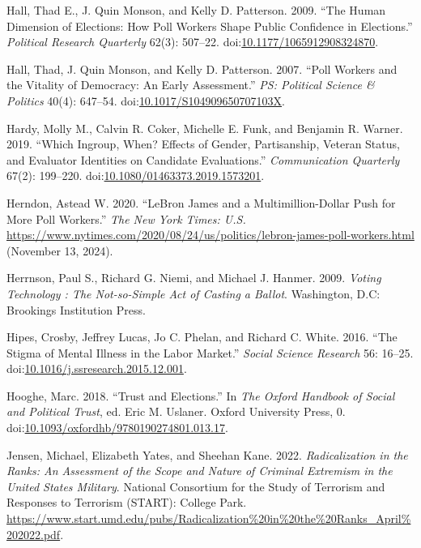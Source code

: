 \documentclass[
  12pt,
  letterpaper,
]{article}
\newlength{\cslhangindent}
\newenvironment{CSLReferences}[2] %
 {\begin{list}{}{%
  \setlength{\itemindent}{0pt}
  \setlength{\leftmargin}{0pt}
  \setlength{\parsep}{0pt}
  \ifodd #1
   \setlength{\leftmargin}{\cslhangindent}
   \setlength{\itemindent}{-1\cslhangindent}
  \fi
  \setlength{\itemsep}{#2\baselineskip}}}
 {\end{list}}
\begin{document}
\begin{CSLReferences}{1}{1}
Hall, Thad E., J. Quin Monson, and Kelly D. Patterson. 2009. {``The
{Human Dimension} of {Elections}: {How Poll Workers Shape Public
Confidence} in {Elections}.''} \emph{Political Research Quarterly}
62(3): 507--22.
doi:\href{https://doi.org/10.1177/1065912908324870}{10.1177/1065912908324870}.

Hall, Thad, J. Quin Monson, and Kelly D. Patterson. 2007. {``Poll
{Workers} and the {Vitality} of {Democracy}: {An Early Assessment}.''}
\emph{PS: Political Science \& Politics} 40(4): 647--54.
doi:\href{https://doi.org/10.1017/S104909650707103X}{10.1017/S104909650707103X}.

Hardy, Molly M., Calvin R. Coker, Michelle E. Funk, and Benjamin R.
Warner. 2019. {``Which Ingroup, When? {Effects} of Gender, Partisanship,
Veteran Status, and Evaluator Identities on Candidate Evaluations.''}
\emph{Communication Quarterly} 67(2): 199--220.
doi:\href{https://doi.org/10.1080/01463373.2019.1573201}{10.1080/01463373.2019.1573201}.

Herndon, Astead W. 2020. {``{LeBron James} and a {Multimillion-Dollar
Push} for {More Poll Workers}.''} \emph{The New York Times: U.S.}
\url{https://www.nytimes.com/2020/08/24/us/politics/lebron-james-poll-workers.html}
(November 13, 2024).

Herrnson, Paul S., Richard G. Niemi, and Michael J. Hanmer. 2009.
\emph{Voting Technology : The Not-so-Simple Act of Casting a Ballot}.
Washington, D.C: Brookings Institution Press.

Hipes, Crosby, Jeffrey Lucas, Jo C. Phelan, and Richard C. White. 2016.
{``The Stigma of Mental Illness in the Labor Market.''} \emph{Social
Science Research} 56: 16--25.
doi:\href{https://doi.org/10.1016/j.ssresearch.2015.12.001}{10.1016/j.ssresearch.2015.12.001}.

Hooghe, Marc. 2018. {``Trust and {Elections}.''} In \emph{The {Oxford
Handbook} of {Social} and {Political Trust}}, ed. Eric M. Uslaner.
Oxford University Press, 0.
doi:\href{https://doi.org/10.1093/oxfordhb/9780190274801.013.17}{10.1093/oxfordhb/9780190274801.013.17}.

Jensen, Michael, Elizabeth Yates, and Sheehan Kane. 2022.
\emph{Radicalization in the {Ranks}: {An Assessment} of the {Scope} and
{Nature} of {Criminal Extremism} in the {United States Military}}.
{National Consortium for the Study of Terrorism and Responses to
Terrorism (START): College Park}.
\url{https://www.start.umd.edu/pubs/Radicalization\%20in\%20the\%20Ranks_April\%202022.pdf}.


\end{CSLReferences}
\end{document}
